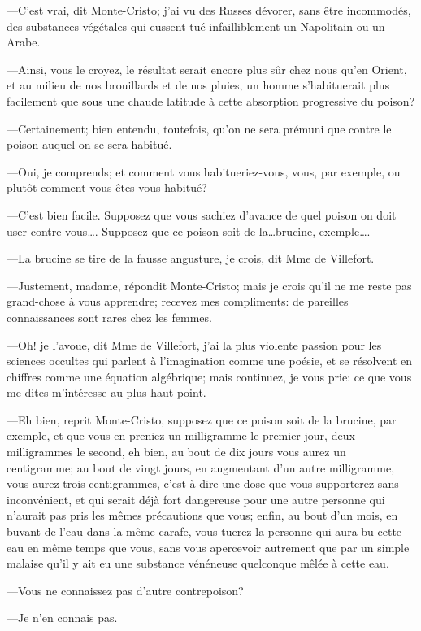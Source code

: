 —C'est vrai, dit Monte-Cristo; j'ai vu des Russes dévorer, sans être incommodés, des substances végétales qui eussent tué infailliblement un Napolitain ou un Arabe. 

—Ainsi, vous le croyez, le résultat serait encore plus sûr chez nous qu'en Orient, et au milieu de nos brouillards et de nos pluies, un homme s'habituerait plus facilement que sous une chaude latitude à cette absorption progressive du poison?  

—Certainement; bien entendu, toutefois, qu'on ne sera prémuni que contre le poison auquel on se sera habitué. 

—Oui, je comprends; et comment vous habitueriez-vous, vous, par exemple, ou plutôt comment vous êtes-vous habitué? 

—C'est bien facile. Supposez que vous sachiez d'avance de quel poison on doit user contre vous\dots. Supposez que ce poison soit de la\dots brucine, exemple\dots. 

—La brucine se tire de la fausse angusture, je crois, dit Mme de Villefort. 

—Justement, madame, répondit Monte-Cristo; mais je crois qu'il ne me reste pas grand-chose à vous apprendre; recevez mes compliments: de pareilles connaissances sont rares chez les femmes. 

—Oh! je l'avoue, dit Mme de Villefort, j'ai la plus violente passion pour les sciences occultes qui parlent à l'imagination comme une poésie, et se résolvent en chiffres comme une équation algébrique; mais continuez, je vous prie: ce que vous me dites m'intéresse au plus haut point. 

—Eh bien, reprit Monte-Cristo, supposez que ce poison soit de la brucine, par exemple, et que vous en preniez un milligramme le premier jour, deux milligrammes le second, eh bien, au bout de dix jours vous aurez un centigramme; au bout de vingt jours, en augmentant d'un autre milligramme, vous aurez trois centigrammes, c'est-à-dire une dose que vous supporterez sans inconvénient, et qui serait déjà fort dangereuse pour une autre personne qui n'aurait pas pris les mêmes précautions que vous; enfin, au bout d'un mois, en buvant de l'eau dans la même carafe, vous tuerez la personne qui aura bu cette eau en même temps que vous, sans vous apercevoir autrement que par un simple malaise qu'il y ait eu une substance vénéneuse quelconque mêlée à cette eau. 

—Vous ne connaissez pas d'autre contrepoison? 

—Je n'en connais pas. 

